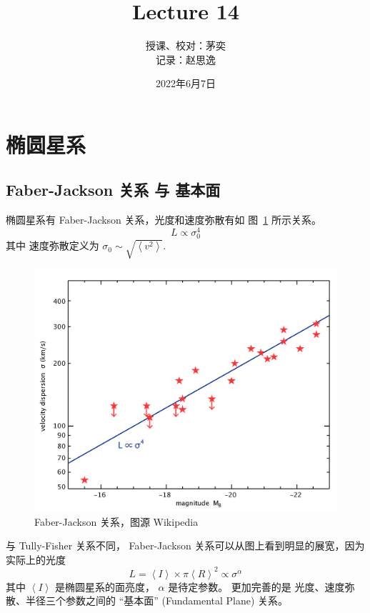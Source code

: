 \documentclass[12pt]{ctexart}
\title{Lecture 14}
\author{授课、校对：茅奕  \\ 记录：赵思逸}
\date{2022年6月7日}
\newcommand{\reffig}[1]{图~\ref{#1}}
\begin{document}
\maketitle

\section{椭圆星系}

\subsection{Faber-Jackson 关系 与 基本面}

椭圆星系有 Faber-Jackson 关系，光度和速度弥散有如 \reffig{fig:Faber-Jackson} 所示关系。
\begin{equation}
    L\propto \sigma_0^4
\end{equation}
其中 速度弥散定义为 $\sigma_0\sim \sqrt{\left\langle v^2 \right\rangle }$.

\begin{figure}[!hbtp]
	\centering
	\includegraphics[width=1.0\linewidth]{Faber_Jackson.png}
	\caption{Faber-Jackson 关系，图源 Wikipedia}  \label{fig:Faber-Jackson}
\end{figure}

与 Tully-Fisher 关系不同， Faber-Jackson 关系可以从图上看到明显的展宽，因为
实际上的光度
\begin{equation}
    L = \left\langle I \right\rangle \times \pi \left\langle R \right\rangle ^2 \propto \sigma^\alpha
\end{equation}
其中 $\left\langle I \right\rangle$ 是椭圆星系的面亮度， $\alpha$ 是待定参数。
更加完善的是 光度、速度弥散、半径三个参数之间的
“基本面” (Fundamental Plane) 关系。
\end{document}
